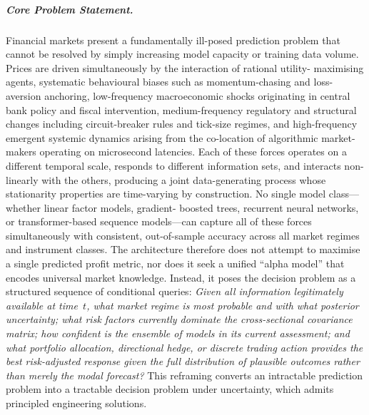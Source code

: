 \documentclass[12pt,openany]{book}
\numberwithin{equation}{chapter}
\theoremstyle{plain}
\theoremstyle{definition}
\theoremstyle{remark}
\begin{document}
\subparagraph{Core Problem Statement.}
Financial markets present a fundamentally ill-posed prediction problem that
cannot be resolved by simply increasing model capacity or training data volume.
Prices are driven simultaneously by the interaction of rational utility-
maximising agents, systematic behavioural biases such as momentum-chasing and
loss-aversion anchoring, low-frequency macroeconomic shocks originating in
central bank policy and fiscal intervention, medium-frequency regulatory and
structural changes including circuit-breaker rules and tick-size regimes, and
high-frequency emergent systemic dynamics arising from the co-location of
algorithmic market-makers operating on microsecond latencies. Each of these
forces operates on a different temporal scale, responds to different
information sets, and interacts non-linearly with the others, producing a joint
data-generating process whose stationarity properties are time-varying by
construction. No single model class---whether linear factor models, gradient-
boosted trees, recurrent neural networks, or transformer-based sequence
models---can capture all of these forces simultaneously with consistent,
out-of-sample accuracy across all market regimes and instrument classes.
The architecture therefore does not attempt to maximise a single predicted
profit metric, nor does it seek a unified ``alpha model'' that encodes
universal market knowledge. Instead, it poses the decision problem as a
structured sequence of conditional queries: \emph{Given all information
legitimately available at time~$t$, what market regime is most probable and
with what posterior uncertainty; what risk factors currently dominate the
cross-sectional covariance matrix; how confident is the ensemble of models in
its current assessment; and what portfolio allocation, directional hedge, or
discrete trading action provides the best risk-adjusted response given the
full distribution of plausible outcomes rather than merely the modal
forecast?} This reframing converts an intractable prediction problem into a
tractable decision problem under uncertainty, which admits principled
engineering solutions.
\end{document}
